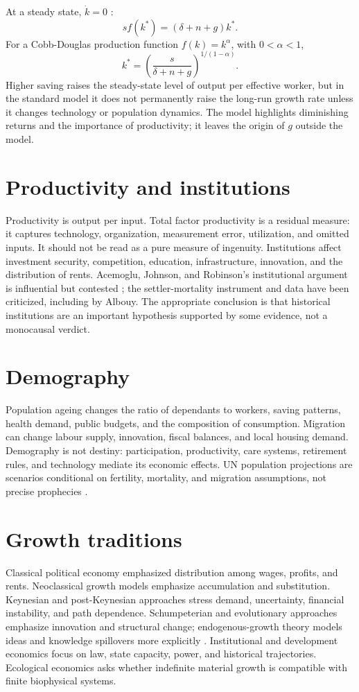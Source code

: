 \documentclass[11pt,oneside,openany]{book}
\begin{document}
At a steady state, $\dot{k}=0$ \cite{solow1956}:
\[
  s f(k^*)=(\delta+n+g)k^*.
\]
For a Cobb-Douglas production function $f(k)=k^\alpha$, with $0<\alpha<1$,
\[
  k^*=\left(\frac{s}{\delta+n+g}\right)^{1/(1-\alpha)}.
\]
Higher saving raises the steady-state level of output per effective worker, but in the standard model it does not permanently raise the long-run growth rate unless it changes technology or population dynamics. The model highlights diminishing returns and the importance of productivity; it leaves the origin of $g$ outside the model.

\section{Productivity and institutions}

Productivity is output per input. Total factor productivity is a residual measure: it captures technology, organization, measurement error, utilization, and omitted inputs. It should not be read as a pure measure of ingenuity. Institutions affect investment security, competition, education, infrastructure, innovation, and the distribution of rents. Acemoglu, Johnson, and Robinson's institutional argument is influential but contested \cite{acemoglu2001,albouy2012}; the settler-mortality instrument and data have been criticized, including by Albouy. The appropriate conclusion is that historical institutions are an important hypothesis supported by some evidence, not a monocausal verdict.

\section{Demography}

Population ageing changes the ratio of dependants to workers, saving patterns, health demand, public budgets, and the composition of consumption. Migration can change labour supply, innovation, fiscal balances, and local housing demand. Demography is not destiny: participation, productivity, care systems, retirement rules, and technology mediate its economic effects. UN population projections are scenarios conditional on fertility, mortality, and migration assumptions, not precise prophecies \cite{un2024}.

\section{Growth traditions}

Classical political economy emphasized distribution among wages, profits, and rents. Neoclassical growth models emphasize accumulation and substitution. Keynesian and post-Keynesian approaches stress demand, uncertainty, financial instability, and path dependence. Schumpeterian and evolutionary approaches emphasize innovation and structural change; endogenous-growth theory models ideas and knowledge spillovers more explicitly \cite{romer1990}. Institutional and development economics focus on law, state capacity, power, and historical trajectories. Ecological economics asks whether indefinite material growth is compatible with finite biophysical systems.
\end{document}
